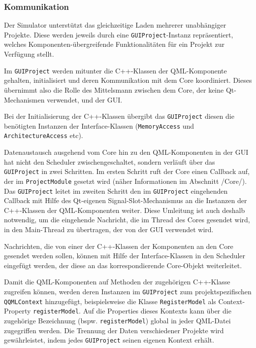\subsubsection{Kommunikation}
\label{gui-kommunikation}

Der Simulator unterstützt das gleichzeitige Laden mehrerer unabhängiger
Projekte. Diese werden jeweils durch eine \texttt{GUIProject}-Instanz
repräsentiert, welches Komponenten-über\-grei\-fen\-de Funktionalitäten für ein
Projekt zur Verfügung stellt.

Im \texttt{GUIProject} werden mitunter die C++-Klassen der QML-Komponente
gehalten, initialisiert und deren Kommunikation mit dem Core koordiniert.
Dieses übernimmt also die Rolle des Mittelsmann zwischen dem Core, der keine
Qt-Mechanismen verwendet, und der GUI.

Bei der Initialisierung der C++-Klassen übergibt das \texttt{GUIProject} diesen
die benötigten Instanzen der Interface-Klassen (\texttt{MemoryAccess} und
\texttt{ArchitectureAccess} etc).

Datenaustausch ausgehend vom Core hin zu den QML-Komponenten in der GUI hat
nicht den Scheduler zwischengeschaltet, sondern verläuft über das
\texttt{GUIProject} in zwei Schritten. Im ersten Schritt ruft der Core einen
Callback auf, der im \texttt{ProjectModule} gesetzt wird (näher Informationen im
Abschnitt /Core/). Das \texttt{GUIProject} leitet im zweiten Schritt den im
\texttt{GUIProject} eingehenden Callback mit Hilfe des Qt-eigenen
Signal-Slot-Mechanismus an die Instanzen der C++-Klassen der QML-Komponenten
weiter. Diese Umleitung ist auch deshalb notwendig, um die eingehende Nachricht,
die im Thread des Cores gesendet wird, in den Main-Thread zu übertragen, der von
der GUI verwendet wird.

Nachrichten, die von einer der C++-Klassen der Komponenten an den Core gesendet
werden sollen, können mit Hilfe der Interface-Klassen in den Scheduler eingefügt
werden, der diese an das korrespondierende Core-Objekt weiterleitet.

Damit die QML-Komponenten auf Methoden der zugehörigen C++-Klasse zugreifen
können, werden deren Instanzen im \texttt{GUIProject} zum projektspezifischen
\texttt{QQMLContext} hinzugefügt, beispielsweise die Klasse
\texttt{RegisterModel} als Context-Property \texttt{registerModel}. Auf die
Properties dieses Kontexts kann über die zugehörige Bezeichnung (bspw.
\texttt{registerModel}) global in jeder QML-Datei zugegriffen werden. Die
Trennung der Daten verschiedener Projekte wird gewährleistet, indem jedes
\texttt{GUIProject} seinen eigenen Kontext erhält.

